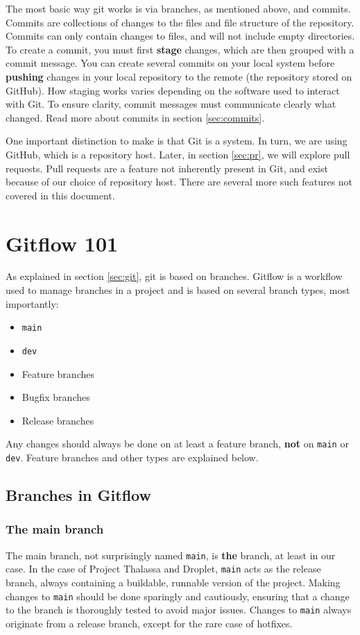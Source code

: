 \documentclass[12pt,a4paper]{article}
\begin{document}
    The most basic way git works is via branches, as mentioned above, and commits. Commits are collections of changes to the files and file structure of the repository. Commits can only contain changes to files, and will not include empty directories. To create a commit, you must first \textbf{stage} changes, which are then grouped with a commit message. You can create several commits on your local system before \textbf{pushing} changes in your local repository to the remote (the repository stored on GitHub). How staging works varies depending on the software used to interact with Git. To ensure clarity, commit messages must communicate clearly what changed. Read more about commits in section \ref{sec:commits}.
    
    One important distinction to make is that Git is a system. In turn, we are using GitHub, which is a repository host. Later, in section \ref{sec:pr}, we will explore pull requests. Pull requests are a feature not inherently present in Git, and exist because of our choice of repository host. There are several more such features not covered in this document.

\section{Gitflow 101}
    \label{sec:gitflow}
    As explained in section \ref{sec:git}, git is based on branches. Gitflow is a workflow used to manage branches in a project and is based on several branch types, most importantly:
    \begin{itemize}
        \item \verb|main|
        \item \verb|dev|
        \item Feature branches
        \item Bugfix branches
        \item Release branches
    \end{itemize}
    
    Any changes should always be done on at least a feature branch, \textbf{not} on \verb|main| or \verb|dev|. Feature branches and other types are explained below.

    \subsection{Branches in Gitflow}
    \label{subsec:gitflow_branches}
        
        \subsubsection{The main branch}
            The main branch, not surprisingly named \verb|main|, is \textbf{the} branch, at least in our case. In the case of Project Thalassa and Droplet, \verb|main| acts as the release branch, always containing a buildable, runnable version of the project. Making changes to \verb|main| should be done sparingly and cautiously, ensuring that a change to the branch is thoroughly tested to avoid major issues. Changes to \verb|main| always originate from a release branch, except for the rare case of hotfixes.
        
\end{document}
